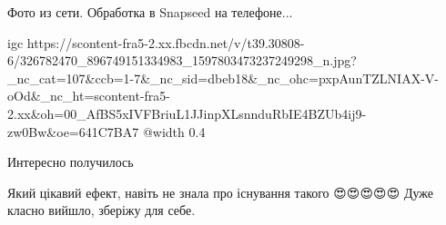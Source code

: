  
 
 
 
 

\qqSecCmt


Фото из сети. Обработка в Snapseed на телефоне...

\ifcmt
  igc https://scontent-fra5-2.xx.fbcdn.net/v/t39.30808-6/326782470_896749151334983_1597803473237249298_n.jpg?_nc_cat=107&ccb=1-7&_nc_sid=dbeb18&_nc_ohc=pxpAunTZLNIAX-V-oOd&_nc_ht=scontent-fra5-2.xx&oh=00_AfBS5xIVFBriuL1JJinpXLsnnduRbIE4BZUb4ij9-zw0Bw&oe=641C7BA7
	@width 0.4
\fi


Интересно получилось


Який цікавий ефект, навіть не знала про існування такого 😍😍😍😍😍 Дуже класно
вийшло, зберіжу для себе.
